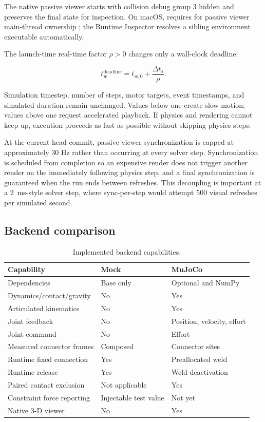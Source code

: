The native passive viewer starts with collision debug group 3 hidden and preserves the
final state for inspection. On macOS, \mujoco{} requires  for passive
viewer main-thread ownership \citep{mujocoPythonDocs}; the Runtime Inspector resolves a
sibling environment executable automatically.

The launch-time real-time factor $\rho>0$ changes only a wall-clock deadline:

\begin{equation}
t_w^{\mathrm{deadline}} = t_{w,0}+\frac{\Delta t_s}{\rho}.
\label{eq:pacing}
\end{equation}

Simulation timestep, number of steps, motor targets, event timestamps, and simulated
duration remain unchanged. Values below one create slow motion; values above one request
accelerated playback. If physics and rendering cannot keep up, execution proceeds as
fast as possible without skipping physics steps.

At the current head commit, passive viewer synchronization is capped at approximately
30 Hz rather than occurring at every solver step. Synchronization is scheduled from
completion so an expensive render does not trigger another render on the immediately
following physics step, and a final synchronization is guaranteed when the run ends
between refreshes. This decoupling is important at a \SI{2}{ms}-style solver step,
where sync-per-step would attempt 500 visual refreshes per simulated second.

\subsection{Backend comparison}

\begin{table}[htbp]
\centering
\caption{Implemented backend capabilities.}
\label{tab:backend-comparison}
\begin{tabularx}{\textwidth}{L{0.30\textwidth}YY}
\toprule
Capability & Mock & MuJoCo \\
\midrule
Dependencies & Base only & Optional  and NumPy \\
Dynamics/contact/gravity & No & Yes \\
Articulated kinematics & No & Yes \\
Joint feedback & No & Position, velocity, effort \\
Joint command & No & Effort \\
Measured connector frames & Composed & Connector sites \\
Runtime fixed connection & Yes & Preallocated weld \\
Runtime release & Yes & Weld deactivation \\
Paired contact exclusion & Not applicable & Yes \\
Constraint force reporting & Injectable test value & Not yet \\
Native 3-D viewer & No & Yes \\
\bottomrule
\end{tabularx}
\end{table}

